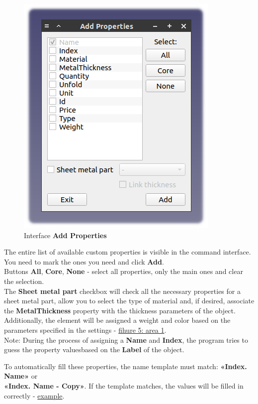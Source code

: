 \documentclass[a4paper,12pt]{article}
\begin{document}
\begin{figure}[htp]
\centering
\includegraphics[scale=0.8]{img/properties_add.png}
\caption{Interface \textbf{Add Properties}}
\label{sec:properties_add}
\end{figure}

The entire list of available custom properties is visible in the command interface. You need to mark the ones you need and click \textbf{Add}.\\

Buttons \textbf{All}, \textbf{Core}, \textbf{None} - select all properties, only the main ones and clear the selection.\\

The \textbf{Sheet metal part} checkbox will check all the necessary properties for a sheet metal part, allow you to select the type of material and, if desired, associate the \textbf{MetalThickness} property with the thickness parameters of the object. Additionally, the element will be assigned a weight and color based on the parameters specified in the settings - \hyperref[sec:pref_sm]{fihure 5: area 1}.\\

Note: During the process of assigning a \textbf{Name} and \textbf{Index}, the program tries to guess the property values ​​based on the \textbf{Label} of the object.

To automatically fill these properties, the name template must match: \textbf{«Index. Name»} or\\\textbf{«Index. Name - Copy»}. If the template matches, the values ​​will be filled in correctly - \hyperref[sec:properties]{example}.
\end{document}
